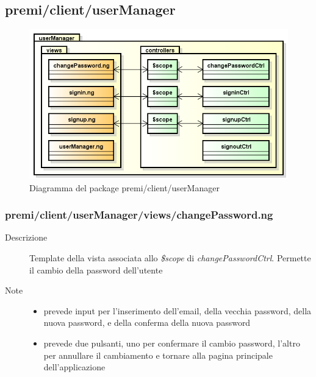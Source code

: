 \clearpage
\subsection{premi/client/userManager}
\begin{figure}[H]
\begin{center}
\includegraphics[scale=0.65]{img/diapkg/userManager.png}
\caption{Diagramma del package premi/client/userManager}
\end{center}
\end{figure}



\subsubsection{premi/client/userManager/views/changePassword.ng}

\begin{description}
\item[Descrizione] \hfill
	Template della vista associata allo \textit{\$scope} di \textit{changePasswordCtrl}. Permette il cambio della password dell'utente
\item[Note] \hfill
	\begin{itemize}
			\item prevede input per l'inserimento dell'email, della vecchia password, della nuova password, e della conferma della nuova password
			\item prevede due pulsanti, uno per confermare il cambio password, l'altro per annullare il cambiamento e tornare alla pagina principale dell'applicazione
	\end{itemize}
\end{description}

